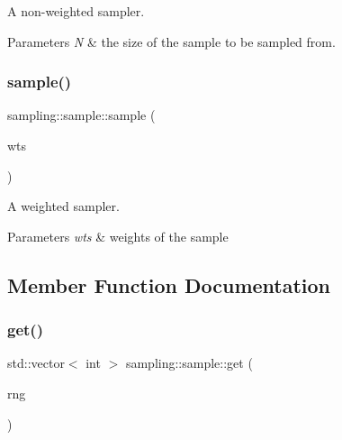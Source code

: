 A non-\/weighted sampler.


\begin{DoxyParams}{Parameters}
{\em N} & the size of the sample to be sampled from. \\
\hline
\end{DoxyParams}
\mbox{\label{classsampling_1_1sample_aa5ce07807a24cd3387626b99b38255ad}} 
\subsubsection{\texorpdfstring{sample()}{sample()}\hspace{0.1cm}{\footnotesize\ttfamily [2/2]}}
{\footnotesize\ttfamily sampling\+::sample\+::sample (\begin{DoxyParamCaption}\item[{const std\+::vector$<$ double $>$ \&}]{wts }\end{DoxyParamCaption})}

A weighted sampler.


\begin{DoxyParams}{Parameters}
{\em wts} & weights of the sample \\
\hline
\end{DoxyParams}


\subsection{Member Function Documentation}
\mbox{\label{classsampling_1_1sample_addc486d8e1dca7d0a09be0a7fa95fc77}} 
\subsubsection{\texorpdfstring{get()}{get()}\hspace{0.1cm}{\footnotesize\ttfamily [1/2]}}
{\footnotesize\ttfamily std\+::vector$<$ int $>$ sampling\+::sample\+::get (\begin{DoxyParamCaption}\item[{\hyperlink{classsampling_1_1RNG}{sampling\+::\+R\+NG} \&}]{rng }\end{DoxyParamCaption})}

